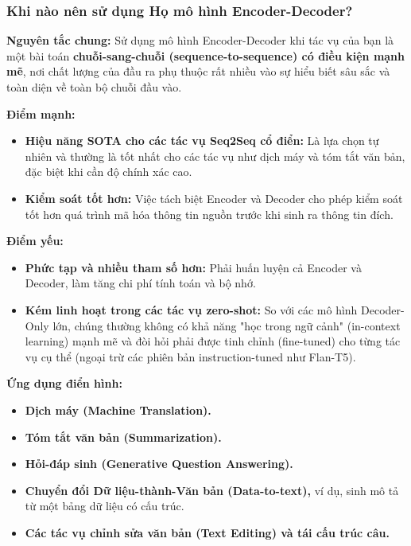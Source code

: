 \subsubsection{Khi nào nên sử dụng Họ mô hình Encoder-Decoder?}
\begin{tcolorbox}[
    title=Đánh giá Họ Mô hình Encoder-Decoder,
    colback=green!5!white, colframe=green!60!black, fonttitle=\bfseries
]
\textbf{Nguyên tắc chung:} Sử dụng mô hình Encoder-Decoder khi tác vụ của bạn là một bài toán \textbf{chuỗi-sang-chuỗi (sequence-to-sequence) có điều kiện mạnh mẽ}, nơi chất lượng của đầu ra phụ thuộc rất nhiều vào sự hiểu biết sâu sắc và toàn diện về toàn bộ chuỗi đầu vào.

\textbf{Điểm mạnh:}
\begin{itemize}
    \item \textbf{Hiệu năng SOTA cho các tác vụ Seq2Seq cổ điển:} Là lựa chọn tự nhiên và thường là tốt nhất cho các tác vụ như dịch máy và tóm tắt văn bản, đặc biệt khi cần độ chính xác cao.
    \item \textbf{Kiểm soát tốt hơn:} Việc tách biệt Encoder và Decoder cho phép kiểm soát tốt hơn quá trình mã hóa thông tin nguồn trước khi sinh ra thông tin đích.
\end{itemize}
\textbf{Điểm yếu:}
\begin{itemize}
    \item \textbf{Phức tạp và nhiều tham số hơn:} Phải huấn luyện cả Encoder và Decoder, làm tăng chi phí tính toán và bộ nhớ.
    \item \textbf{Kém linh hoạt trong các tác vụ zero-shot:} So với các mô hình Decoder-Only lớn, chúng thường không có khả năng "học trong ngữ cảnh" (in-context learning) mạnh mẽ và đòi hỏi phải được tinh chỉnh (fine-tuned) cho từng tác vụ cụ thể (ngoại trừ các phiên bản instruction-tuned như Flan-T5).
\end{itemize}
\textbf{Ứng dụng điển hình:}
\begin{itemize}
    \item \textbf{Dịch máy (Machine Translation).}
    \item \textbf{Tóm tắt văn bản (Summarization).}
    \item \textbf{Hỏi-đáp sinh (Generative Question Answering).}
    \item \textbf{Chuyển đổi Dữ liệu-thành-Văn bản (Data-to-text),} ví dụ, sinh mô tả từ một bảng dữ liệu có cấu trúc.
    \item \textbf{Các tác vụ chỉnh sửa văn bản (Text Editing) và tái cấu trúc câu.}
\end{itemize}
\end{tcolorbox}
